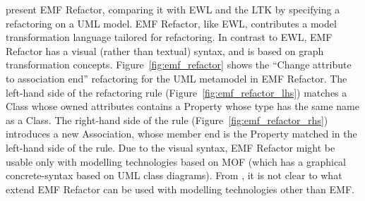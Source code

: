 \cite{arendt09refactoring} present EMF Refactor, comparing it with EWL and the LTK by specifying a refactoring on a UML model. EMF Refactor, like EWL, contributes a model transformation language tailored for refactoring. In contrast to EWL, EMF Refactor has a visual (rather than textual) syntax, and is based on graph transformation concepts. Figure~\ref{fig:emf_refactor} shows the ``Change attribute to association end'' refactoring for the UML metamodel in EMF Refactor. The left-hand side of the refactoring rule (Figure~\ref{fig:emf_refactor_lhs}) matches a Class whose owned attributes contains a Property whose type has the same name as a Class. The right-hand side of the rule (Figure~\ref{fig:emf_refactor_rhs}) introduces a new Association, whose member end is the Property matched in the left-hand side of the rule. Due to the visual syntax, EMF Refactor might be usable only with modelling technologies based on MOF (which has a graphical concrete-syntax based on UML class diagrams).  From \cite{arendt09refactoring}, it is not clear to what extend EMF Refactor can be used with modelling technologies other than EMF.

